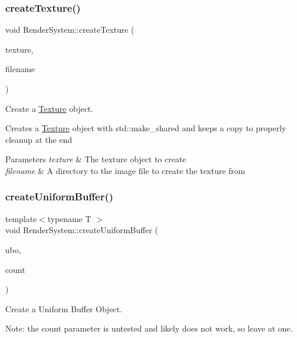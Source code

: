 \subsubsection{\texorpdfstring{createTexture()}{createTexture()}}
{\footnotesize\ttfamily void Render\+System\+::create\+Texture (\begin{DoxyParamCaption}\item[{std\+::shared\+\_\+ptr$<$ \mbox{\hyperlink{class_texture}{Texture}} $>$ \&}]{texture,  }\item[{const std\+::string \&}]{filename }\end{DoxyParamCaption})}



Create a \mbox{\hyperlink{class_texture}{Texture}} object. 

Creates a \mbox{\hyperlink{class_texture}{Texture}} object with std\+::make\+\_\+shared and keeps a copy to properly cleanup at the end


\begin{DoxyParams}{Parameters}
{\em texture} & The texture object to create \\
\hline
{\em filename} & A directory to the image file to create the texture from \\
\hline
\end{DoxyParams}
\mbox{\label{class_render_system_a43e41f536fee8a17796034acaeafb6e9}} 
\subsubsection{\texorpdfstring{createUniformBuffer()}{createUniformBuffer()}}
{\footnotesize\ttfamily template$<$typename T $>$ \\
void Render\+System\+::create\+Uniform\+Buffer (\begin{DoxyParamCaption}\item[{std\+::shared\+\_\+ptr$<$ \mbox{\hyperlink{struct_u_b_o}{U\+BO}} $>$ \&}]{ubo,  }\item[{const size\+\_\+t \&}]{count }\end{DoxyParamCaption})\hspace{0.3cm}{\ttfamily [inline]}}



Create a Uniform Buffer Object. 

Note\+: the count parameter is untested and likely does not work, so leave at one.


